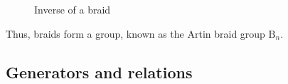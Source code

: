 \documentclass[10pt]{beamer}
\theoremstyle{definition}
\newcommand{\I}{\mathbfbb{I}}
\newcommand{\B}{\mathrm{B}}
\begin{document}
\begin{frame}
\begin{figure}
{\begin{tikzpicture}[scale=1]
				\end{tikzpicture}\label{fig:braidinverse3}}
%
%
			\caption*{Inverse of a braid}\label{fig:braidinverse}
		\end{figure}
	\end{frame}

	\begin{frame}
	    Thus, braids form a group, known as the Artin braid group \(\B_n\).
	\end{frame}

	\subsection{Generators and relations}
\end{document}
